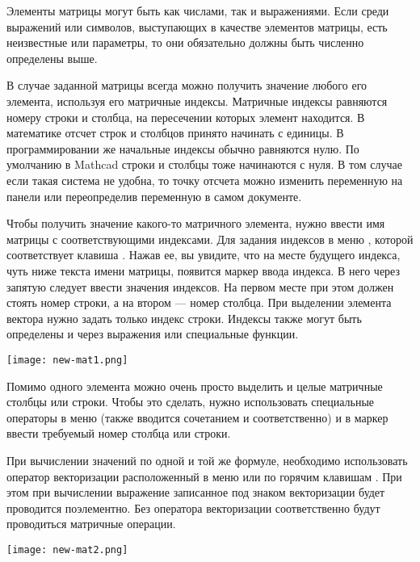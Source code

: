 Элементы матрицы могут быть как числами, так и выражениями. Если среди выражений или символов, выступающих в качестве элементов матрицы, есть неизвестные или параметры, то они обязательно должны быть численно определены выше.


В случае заданной матрицы всегда можно получить значение любого его элемента, используя его матричные индексы. Матричные индексы равняются номеру строки и столбца, на пересечении которых элемент находится. В математике отсчет строк и столбцов принято начинать с единицы. В программировании же начальные индексы обычно равняются нулю. По умолчанию в Mathcad строки и столбцы тоже начинаются с нуля. В том случае если такая система не удобна, то точку отсчета можно изменить переменную  на панели   или переопределив переменную в самом документе.

Чтобы получить значение какого-то матричного элемента, нужно ввести имя матрицы с соответствующими индексами. Для задания индексов  в меню , которой соответствует клавиша \keys{[}. Нажав ее, вы увидите, что на месте будущего индекса, чуть ниже текста имени матрицы, появится маркер ввода индекса. В него через запятую следует ввести значения индексов. На первом месте при этом должен стоять номер строки, а на втором --- номер столбца. При выделении элемента вектора нужно задать только индекс строки. Индексы также могут быть определены и через выражения или специальные функции.
\begin{center}
	\texttt{[image: new-mat1.png]}
\end{center}


Помимо одного элемента можно очень просто выделить и целые матричные столбцы или строки. Чтобы это сделать, нужно использовать специальные операторы в меню  (также вводится сочетанием  и   соответственно)  и в маркер ввести требуемый номер столбца или строки.

При вычислении значений по одной и той же формуле, необходимо использовать оператор векторизации расположенный в меню  или по горячим клавишам \keys{\ctrl+\shift+\textasciicircum}. При этом при вычислении выражение записанное под знаком векторизации будет проводится поэлементно. Без оператора векторизации соответственно будут проводиться матричные операции.
\begin{center}
	\texttt{[image: new-mat2.png]}
\end{center}


